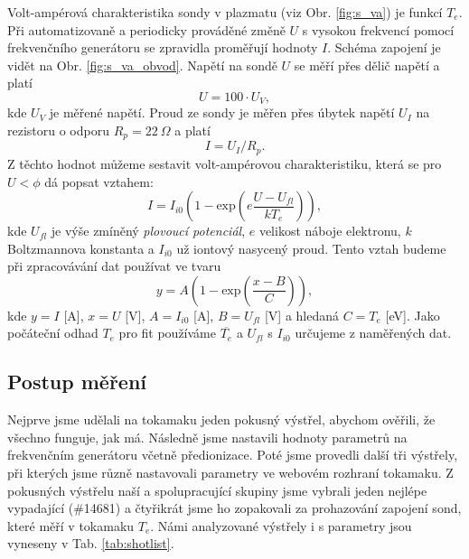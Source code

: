 \documentclass[english]{article}
\newcommand{\unit}[1]{\mathrm{#1}}
\begin{document}
			Volt-ampérová charakteristika sondy v plazmatu (viz Obr. \ref{fig:s_va}) je funkcí $T_e$. Při automatizovaně a periodicky prováděné změně $U$ s vysokou frekvencí pomocí frekvenčního generátoru se zpravidla proměřují hodnoty $I$. Schéma zapojení je vidět na Obr. \ref{fig:s_va_obvod}. Napětí na sondě $U$ se měří přes dělič napětí a platí 
			\begin{equation}
					U=100\cdot U_V,
									\label{eq:prepocet_U}
			\end{equation}kde $U_V$ je měřené napětí. Proud ze sondy je měřen přes úbytek napětí $U_I$ na rezistoru o odporu $R_p=22~\Omega$ a platí 
			\begin{equation}
					I=U_I / R_p.
									\label{eq:prepocet_I}
			\end{equation} Z těchto hodnot můžeme sestavit volt-ampérovou charakteristiku, která se pro $U<\phi$ dá popsat vztahem:
			\begin{equation}
				I = I_{i0}\left(1-\unit{exp}\left(e\frac{U-U_{fl}}{kT_e}\right)\right),
			\end{equation}
			kde $U_{fl}$ je výše zmíněný \emph{plovoucí potenciál}, $e$ velikost náboje elektronu, $k$ Boltzmannova konstanta a $I_{i0}$ už iontový nasycený proud. Tento vztah budeme při zpracovávání dat používat ve tvaru
			\begin{equation}
				y=A\left(1-\unit{exp}\left(\frac{x-B}{C}\right)\right),
				\label{eq:fit}
			\end{equation}
			kde $y=I$ [A], $x=U$ [V], $A=I_{i0}$ [A], $B=U_{fl}$ [V] a hledaná $C=T_e$ [eV]. Jako počáteční odhad $T_e$ pro fit používáme $\overline{T_e}$ a $U_{fl}$ s $I_{i0}$ určujeme z naměřených dat. 
			 
	\subsection{Postup měření}
			Nejprve jsme udělali na tokamaku jeden pokusný výstřel, abychom ověřili, že všechno funguje, jak má.  Následně jsme nastavili hodnoty parametrů na frekvenčním generátoru včetně předionizace. Poté jsme provedli další tři výstřely, při kterých jsme různě nastavovali parametry ve webovém rozhraní tokamaku. Z pokusných výstřelu naší a spolupracující skupiny jsme vybrali jeden nejlépe vypadající (\#14681) a čtyřikrát jsme ho zopakovali za prohazování zapojení sond, které měří v tokamaku $T_e$. Námi analyzované výstřely i s parametry jsou vyneseny v Tab. \ref{tab:shotlist}.
			
\end{document}
